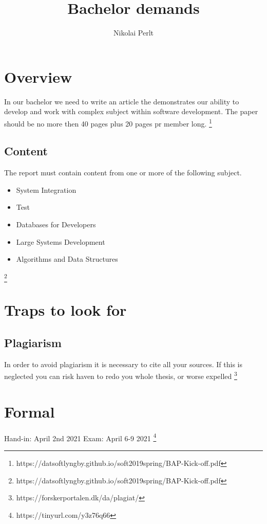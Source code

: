 \documentclass[a4paper]{article}
\title{Bachelor demands}
\author{Nikolai Perlt}
\begin{document}
    \maketitle
    
    \section{Overview}
    In our bachelor we need to write an article the demonstrates our ability to develop and work with complex subject within software development.
    The paper should be no more then 40 pages plus 20 pages pr member long. \footnote{https://datsoftlyngby.github.io/soft2019spring/BAP-Kick-off.pdf}
        \subsection{Content}
            The report must contain content from one or more of the following subject.
            \begin{itemize}
                \item System Integration
                \item Test
                \item Databases for Developers
                \item Large Systems Development
                \item Algorithms and Data Structures
            \end{itemize} \footnote{https://datsoftlyngby.github.io/soft2019spring/BAP-Kick-off.pdf}

    \section{Traps to look for}
    
    \subsection{Plagiarism}
    In order to avoid plagiarism it is necessary to cite all your sources. If this is neglected you 
    can risk haven to redo you whole thesis, or worse expelled \footnote{https://forskerportalen.dk/da/plagiat/}
    
    \section{Formal}
    Hand-in: April 2nd 2021 \newline 
    Exam: April 6-9 2021 \newline
    \footnote{https://tinyurl.com/y3z76q66}
\end{document}
